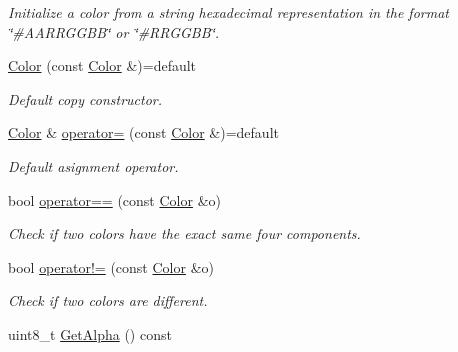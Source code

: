 \begin{DoxyCompactItemize}
\begin{DoxyCompactList}\small\item\em Initialize a color from a string hexadecimal representation in the format \char`\"{}\#\-A\-A\-R\-R\-G\-G\-B\-B\char`\"{} or \char`\"{}\#\-R\-R\-G\-G\-B\-B\char`\"{}. \end{DoxyCompactList}\item 
\hypertarget{classTmx_1_1Color_a47a6ba4d9445bcdcafefc63f41c46d69}{\hyperlink{classTmx_1_1Color_a47a6ba4d9445bcdcafefc63f41c46d69}{Color} (const \hyperlink{classTmx_1_1Color}{Color} \&)=default}\label{classTmx_1_1Color_a47a6ba4d9445bcdcafefc63f41c46d69}

\begin{DoxyCompactList}\small\item\em Default copy constructor. \end{DoxyCompactList}\item 
\hypertarget{classTmx_1_1Color_ac3b6cab5ff3052ff7253d70fc0ecba50}{\hyperlink{classTmx_1_1Color}{Color} \& \hyperlink{classTmx_1_1Color_ac3b6cab5ff3052ff7253d70fc0ecba50}{operator=} (const \hyperlink{classTmx_1_1Color}{Color} \&)=default}\label{classTmx_1_1Color_ac3b6cab5ff3052ff7253d70fc0ecba50}

\begin{DoxyCompactList}\small\item\em Default asignment operator. \end{DoxyCompactList}\item 
\hypertarget{classTmx_1_1Color_a7514ffb5992a35369655c2ca5e873012}{bool \hyperlink{classTmx_1_1Color_a7514ffb5992a35369655c2ca5e873012}{operator==} (const \hyperlink{classTmx_1_1Color}{Color} \&o)}\label{classTmx_1_1Color_a7514ffb5992a35369655c2ca5e873012}

\begin{DoxyCompactList}\small\item\em Check if two colors have the exact same four components. \end{DoxyCompactList}\item 
\hypertarget{classTmx_1_1Color_a82c3e3199f93d1ce9c2babadd6a9bf40}{bool \hyperlink{classTmx_1_1Color_a82c3e3199f93d1ce9c2babadd6a9bf40}{operator!=} (const \hyperlink{classTmx_1_1Color}{Color} \&o)}\label{classTmx_1_1Color_a82c3e3199f93d1ce9c2babadd6a9bf40}

\begin{DoxyCompactList}\small\item\em Check if two colors are different. \end{DoxyCompactList}\item 
\hypertarget{classTmx_1_1Color_a69661b363a65a82ccecf42209e4ca366}{uint8\-\_\-t \hyperlink{classTmx_1_1Color_a69661b363a65a82ccecf42209e4ca366}{Get\-Alpha} () const }\label{classTmx_1_1Color_a69661b363a65a82ccecf42209e4ca366}


\end{DoxyCompactItemize}

